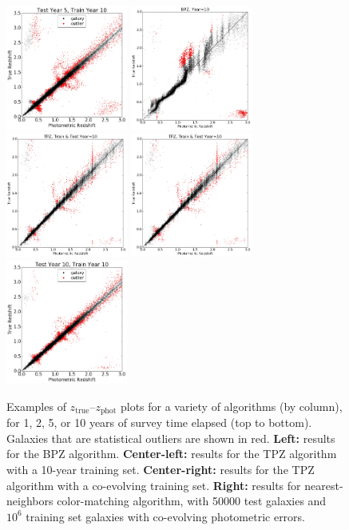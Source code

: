 \documentclass[DM,lsstdraft,toc]{lsstdoc}
\begin{document}
\begin{figure}
\begin{center}
\includegraphics[width=4.0cm]{figures/CM_10Y5_tzpz.png}
\includegraphics[width=4.0cm]{figures/BPZ_Euclid_Y10_tzpz.png}
\includegraphics[width=4.0cm]{figures/TPZ_Euclid_10Y10_tzpz.png}
\includegraphics[width=4.0cm]{figures/TPZ_Euclid_10Y10_tzpz.png}
\includegraphics[width=4.0cm]{figures/CM_10Y10_tzpz.png}
\caption{Examples of $z_\mathrm{true}$--$z_\mathrm{phot}$ plots for a variety of algorithms (by column), for 1, 2, 5, or 10 years of survey time elapsed (top to bottom). Galaxies that are statistical outliers are shown in red. \textbf{Left:} results for the BPZ algorithm. \textbf{Center-left:} results for the TPZ algorithm with a 10-year training set. \textbf{Center-right:} results for the TPZ algorithm with a co-evolving training set. \textbf{Right:} results for nearest-neighbors color-matching algorithm, with 50000 test galaxies and $10^6$ training set galaxies with co-evolving photometric errors. \label{fig:tzpz}}
\end{center}
\end{figure}
\end{document}
